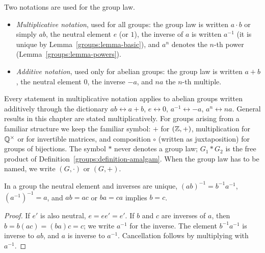 \begin{notation}\label{groups:notation-multiplicative-additive}
Two notations are used for the group law.
\begin{itemize}
\item \emph{Multiplicative notation}, used for all groups: the group law is written
$a \cdot b$ or simply $ab$, the neutral element $e$ (or $1$), the inverse of $a$ is
written $a^{-1}$ (it is unique by Lemma~\ref{groups:lemma-basic}), and $a^n$ denotes
the $n$-th power (Lemma~\ref{groups:lemma-powers}).
\item \emph{Additive notation}, used only for abelian groups: the group law is
written $a + b$, the neutral element $0$, the inverse $-a$, and $na$ the $n$-th
multiple.
\end{itemize}
Every statement in multiplicative notation applies to abelian groups written
additively through the dictionary $ab \leftrightarrow a + b$, $e \leftrightarrow 0$,
$a^{-1} \leftrightarrow -a$, $a^n \leftrightarrow na$. General results in this chapter are
stated multiplicatively. For groups arising from a familiar structure we keep
the familiar symbol: $+$ for $(\mathbb{Z}, +)$, multiplication for $\mathbb{Q}^\times$ or for
invertible matrices, and composition $\circ$ (written as juxtaposition) for groups of
bijections. The symbol $*$ never denotes a group law; $G_1 * G_2$ is the free
product of Definition~\ref{groups:definition-amalgam}. When the group law has to be
named, we write $(G, \cdot)$ or $(G, +)$.
\end{notation}

\begin{lemma}\label{groups:lemma-basic}
In a group the neutral element and inverses are unique, $(ab)^{-1} = b^{-1}a^{-1}$,
$(a^{-1})^{-1} = a$, and $ab = ac$ or $ba = ca$ implies $b = c$.
\end{lemma}

\begin{proof}
If $e'$ is also neutral, $e = ee' = e'$. If $b$ and $c$ are inverses of $a$,
then $b = b(ac) = (ba)c = c$; we write $a^{-1}$ for the inverse. The element
$b^{-1}a^{-1}$ is inverse to $ab$, and $a$ is inverse to $a^{-1}$. Cancellation
follows by multiplying with $a^{-1}$.
\end{proof}

